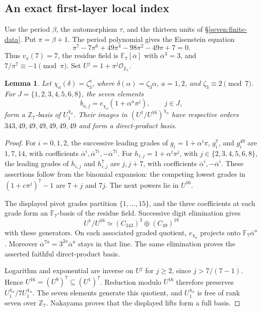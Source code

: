 \documentclass[11pt]{article}
\newtheorem{lemma}[theorem]{Lemma}
\begin{document}
\subsection{An exact first-layer local index}

Use the period $\beta$, the automorphism $\tau$, and the thirteen
units of \S\ref{seven:finite-data}. Put $\pi=\beta+1$. The period
polynomial gives the Eisenstein equation
\begin{equation*}\tag{U11}\label{seven:local-eisenstein}
 \pi^7-7\pi^6+49\pi^4-98\pi^2-49\pi+7=0.
\end{equation*}
Thus $v_\pi(7)=7$, the residue field is
$\mathbb F_7[\overline\alpha]$ with $\overline\alpha^3=3$, and
$7/\pi^7\equiv-1\pmod\pi$. Set $U^j=1+\pi^j\mathcal O_{L_1}$.

\begin{lemma}\label{seven:local-finite-basis}
Let $\chi_a(\delta)=\zeta_3^a$, where
$\delta(\alpha)=\zeta_3\alpha$, $a=1,2$, and
$\zeta_3\equiv2\pmod7$. For
$J=\{1,2,3,4,5,6,8\}$, the seven elements
\[
 b_{a,j}=e_{\chi_a}(1+\alpha^a\pi^j),\qquad j\in J,
\]
form a $\mathbb Z_7$-basis of $U_1^{\chi_a}$.
Their images in $(U^1/U^{16})^{\chi_a}$ have respective orders
$343,49,49,49,49,49,49$ and form a direct-product basis.
\end{lemma}

\begin{proof}
For $i=0,1,2$, the successive leading grades of
$g_i=1+\alpha^i\pi$, $g_i^7$, and $g_i^{49}$ are $1,7,14$,
with coefficients
$\overline\alpha^i,\overline\alpha^{7i},-\overline\alpha^{7i}$.
For $h_{i,j}=1+\alpha^i\pi^j$, with
$j\in\{2,3,4,5,6,8\}$, the leading grades of $h_{i,j}$ and
$h_{i,j}^7$ are $j,j+7$, with coefficients
$\overline\alpha^i,-\overline\alpha^i$.
These assertions follow from the binomial expansion: the competing
lowest grades in $(1+c\pi^j)^7-1$ are $7+j$ and $7j$.
The next powers lie in $U^{16}$.

The displayed pivot grades partition $\{1,\ldots,15\}$, and the three
coefficients at each grade form an $\mathbb F_7$-basis of the residue
field. Successive digit elimination gives
\[
 U^1/U^{16}\simeq(C_{343})^3\oplus(C_{49})^{18}
\]
with these generators. On each associated graded quotient,
$e_{\chi_a}$ projects onto
$\mathbb F_7\overline\alpha^a$.
Moreover
$\overline\alpha^{7a}=3^{2a}\overline\alpha^a$ stays in that line.
The same elimination proves the asserted faithful direct-product
basis.

Logarithm and exponential are inverse on $U^j$ for $j\ge2$, since
$j>7/(7-1)$. Hence
$U^{16}=(U^9)^7\subseteq(U^1)^7$.
Reduction modulo $U^{16}$ therefore preserves
$U_1^{\chi_a}/7U_1^{\chi_a}$. The seven elements generate this quotient,
and $U_1^{\chi_a}$ is free of rank seven over $\mathbb Z_7$.
Nakayama proves that the displayed lifts form a full basis.
\end{proof}
\end{document}
